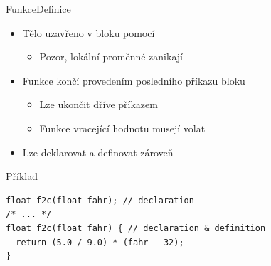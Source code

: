 \begin{frame}[fragile]{Funkce}{Definice}

  \begin{itemize}
    \item Tělo uzavřeno v bloku pomocí \code{\{\}}
    \begin{itemize}
      \item Pozor, lokální proměnné zanikají
    \end{itemize}

    \pause
    \pause

    \item Funkce končí provedením posledního příkazu bloku
    \begin{itemize}
      \item Lze ukončit dříve příkazem 
      \item Funkce vracející hodnotu musejí volat 
    \end{itemize}

    \pause

    \item Lze deklarovat a definovat zároveň
  \end{itemize}


\begin{block}{Příklad}
\begin{lstlisting}
float f2c(float fahr); // declaration
/* ... */
float f2c(float fahr) { // declaration & definition
  return (5.0 / 9.0) * (fahr - 32);
}
\end{lstlisting}
\end{block}

\end{frame}

